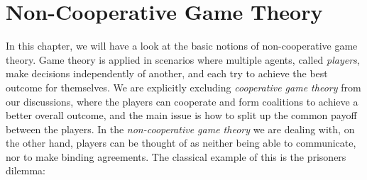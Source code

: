 \documentclass[a4paper]{scrreprt}
\begin{document}
    \chapter{Non-Cooperative Game Theory}
    \label{chap:nonCooperativeRealValuedGameTheory}
    In this chapter, we will have a look at the basic notions of non-cooperative game theory.
    Game theory is applied in scenarios where multiple agents, called \emph{players}, make decisions independently of another, and each try to achieve the best outcome for themselves.
    We are explicitly excluding \emph{cooperative game theory} from our discussions, where the players can cooperate and form coalitions to achieve a better overall outcome, and the main issue is how to split up the common payoff between the players.
    In the \emph{non-cooperative game theory} we are dealing with, on the other hand, players can be thought of as neither being able to communicate, nor to make binding agreements. 
    The classical example of this is the prisoners dilemma:
\end{document}
